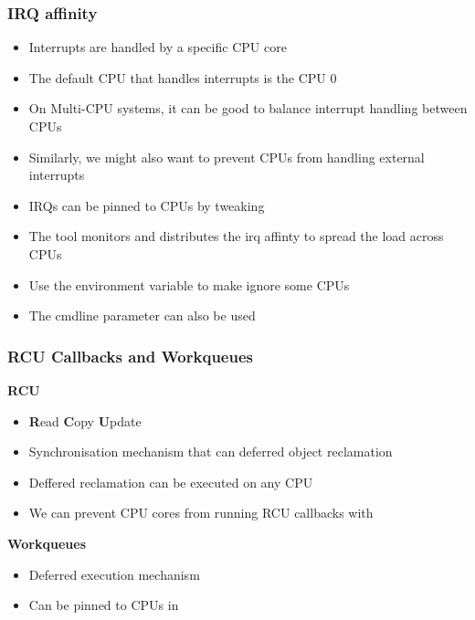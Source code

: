 \begin{frame}
	\frametitle{IRQ affinity}
	\begin{itemize}
		\item Interrupts are handled by a specific CPU core
		\item The default CPU that handles interrupts is the CPU 0
		\item On Multi-CPU systems, it can be good to balance interrupt handling between CPUs
		\item Similarly, we might also want to prevent CPUs from handling external interrupts
		\item IRQs can be pinned to CPUs by tweaking 
		\item The  tool monitors and distributes the irq affinty to spread the load across CPUs
		\item Use the  environment variable to make  ignore some CPUs
		\item The  cmdline parameter can also be used
	\end{itemize}
\end{frame}

\begin{frame}
	\frametitle{RCU Callbacks and Workqueues}
	\begin{center}\textbf{RCU}\end{center}
	\begin{itemize}
		\item \textbf{R}ead \textbf{C}opy \textbf{U}pdate
		\item Synchronisation mechanism that can deferred object reclamation
		\item Deffered reclamation can be executed on any CPU 
		\item We can prevent CPU cores from running RCU callbacks with 
	\end{itemize}
	\begin{center}\textbf{Workqueues}\end{center}
	\begin{itemize}
		\item Deferred execution mechanism
		\item Can be pinned to CPUs in 
	\end{itemize}
\end{frame}

